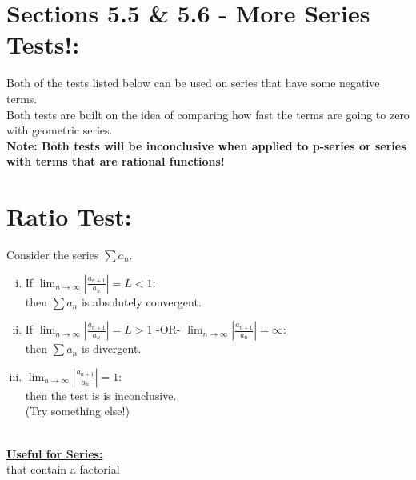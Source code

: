 
\setlength{\columnseprule}{.4pt}
\setlength{\columnsep}{3em}

\section*{Sections 5.5 \& 5.6 - More Series Tests!: }
Both of the tests listed below can be used on series that have some negative terms.\\
Both tests are built on the idea of comparing how fast the terms are going to zero with geometric series.\\
\textbf{Note: Both tests will be inconclusive when applied to p-series or series with terms that are rational functions!}\\


\vspace*{.1in}




\section*{Ratio Test:}
Consider the series \(\sum a_n\). 
 \begin{enumerate}[(i)] 
 \item If \(\lim_{n\rightarrow \infty} \left| \frac{a_{n+1}}{a_n}\right| = L < 1\):\\
  then \(\sum a_n\) is absolutely convergent.\\ 
  \item If \(\lim_{n\rightarrow \infty} \left| \frac{a_{n+1}}{a_n}\right| = L > 1\)
  -OR- 
  \(\lim_{n\rightarrow \infty} \left| \frac{a_{n+1}}{a_n}\right| =\infty\):\\
   then \(\sum a_n\) is divergent.\\
\item \(\lim_{n\rightarrow \infty} \left| \frac{a_{n+1}}{a_n}\right| = 1\):\\
 then the test is is inconclusive.\\
  (Try something else!)
 \end{enumerate} 
 ~\\
 \underline{\textbf{Useful for Series:}}\\
 that contain a factorial
 
